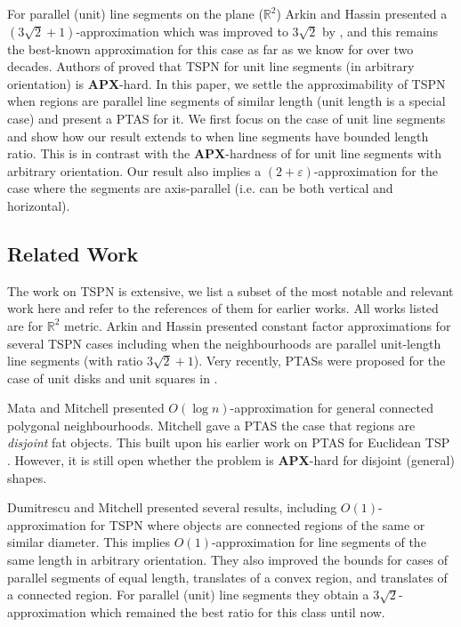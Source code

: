 \documentclass[10pt,a4paper]{amsart}
\theoremstyle{thmstyleone}
\newcommand{\RR}{\mathbb{R}}
\newcommand{\eps}{\varepsilon}
\begin{document}
	For parallel (unit) line segments on the plane ($\RR^2$) Arkin and Hassin \cite{ArkinH94} presented a $(3\sqrt{2}+1)$-approximation which was improved to $3\sqrt{2}$ by \cite{DM03}, and this remains the best-known approximation for this case as far as we know for over two decades. Authors of \cite{EFS09} proved that TSPN for unit line segments (in arbitrary orientation) is \textbf{APX}-hard.
    In this paper, we settle the approximability of TSPN when regions are parallel line segments of similar length (unit length is a special case) and present a PTAS for it. 
	We first focus on the case of unit line segments and show how our result extends to when line segments have bounded length ratio. This is in contrast with the \textbf{APX}-hardness of \cite{EFS09} for unit line segments with arbitrary orientation. Our result also implies a $(2+\eps)$-approximation
    for the case where the segments are axis-parallel (i.e. can be both vertical and horizontal).


\subsection{Related Work}
The work on TSPN is extensive, we list a subset of the  most notable and relevant work here and refer to the references of them for earlier works. All works listed are for $\RR^2$ metric.
Arkin and Hassin \cite{ArkinH94} presented constant factor approximations for several TSPN cases including when the neighbourhoods are parallel unit-length line segments (with ratio $3\sqrt{2}+1$). Very recently, PTASs were proposed for the case of unit disks and unit squares in \cite{soda25}.

Mata and Mitchell \cite{MM95} presented $O(\log n)$-approximation for general connected polygonal neighbourhoods.
Mitchell \cite{Mitchell07} gave a PTAS the case that regions are {\em disjoint} fat objects. This built upon his earlier work on PTAS for Euclidean TSP \cite{mitchell1999guillotine}. However, it is still open whether the problem is \textbf{APX}-hard for disjoint (general) shapes.

Dumitrescu and Mitchell \cite{DM03} presented several results, including $O(1)$-approximation for TSPN where objects are connected regions of the same or similar diameter. This implies $O(1)$-approximation for line segments of the same length in arbitrary orientation. They also 
improved the bounds for cases of parallel segments of equal length, translates of a convex region, and translates of a connected
region. For parallel (unit) line segments they obtain a $3\sqrt{2}$-approximation which remained the best ratio for this class until now.
\end{document}
